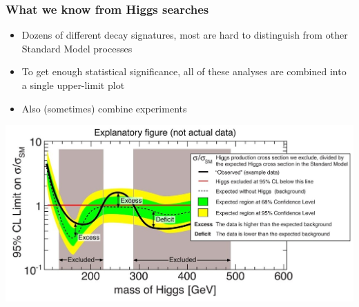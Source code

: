 \documentclass[compress]{beamer}
\begin{document}
\begin{frame}
\frametitle{What we know from Higgs searches}
\begin{itemize}
\item Dozens of different decay signatures, most are hard to distinguish from other Standard Model processes
\item To get enough statistical significance, all of these analyses are combined into a single upper-limit plot
\item Also (sometimes) combine experiments
\end{itemize}

\includegraphics[width=\linewidth]{explaination_limitplot3.jpg}
\end{frame}
\end{document}
